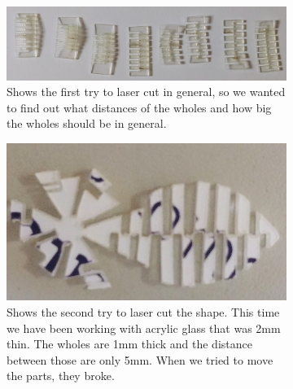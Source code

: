 \documentclass[04.3_buildingProcess.tex]{subfiles}
\begin{document}
\begin{flushleft}
        \begin{figure}[H]
            \centering
            \begin{subfigure}{.45\textwidth}
            \centering
            \includegraphics[width=0.8\linewidth]{images/materialProcess/01_LaserCut.jpg}
            \caption{Shows the first try to laser cut in general, so we wanted to
                    find out what distances of the wholes and how big the wholes 
                    should be in general.}
            \label{fig:01_LaserCut}
            \vspace{6mm}
            \end{subfigure}
            \medskip
            \hspace{1mm}
            \begin{subfigure}{.45\textwidth}
                \centering
                \includegraphics[width=0.8\linewidth]{images/materialProcess/02_LaserCut.jpg}
                \caption{Shows the second try to laser cut the shape. This time we have been
                        working with acrylic glass that was 2mm thin. The wholes are 1mm thick 
                        and the distance between those are only 5mm. When we tried to move
                        the parts, they broke.}
                \label{fig:02_LaserCut}
                \vspace{6mm}
            \end{subfigure}
            \hspace{1mm}
            \begin{subfigure}{.45\textwidth}
                \centering

\end{subfigure}
\end{figure}
\end{flushleft}
\end{document}
